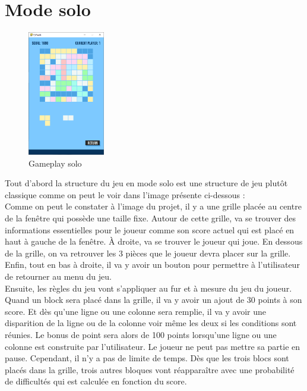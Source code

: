 \documentclass[a4paper]{report}
\begin{document}
\section{Mode solo}
\begin{figure}
    \centering
    \includegraphics[width=0.3\textwidth, trim=0pt 0pt 0pt 30pt]{images/3-ingame.png}
    \caption{Gameplay solo}
\end{figure}
Tout d'abord la structure du jeu en mode solo est une structure de jeu plutôt classique comme on peut le voir dans l'image présente ci-dessous :\\

Comme on peut le constater à l'image du projet, il y a une grille placée au centre de la fenêtre qui possède une taille fixe. Autour de cette grille, va se trouver des informations essentielles pour le joueur comme son score actuel qui est placé en haut à gauche de la fenêtre. À droite, va se trouver le joueur qui joue. En dessous de la grille, on va retrouver les 3 pièces que le joueur devra placer sur la grille. Enfin, tout en bas à droite, il va y avoir un bouton pour permettre à l'utilisateur de retourner au menu du jeu. \\

Ensuite, les règles du jeu vont s'appliquer au fur et à mesure du jeu du joueur. Quand un block sera placé dans la grille, il va y avoir un ajout de 30 points à son score. Et dès qu'une ligne ou une colonne sera remplie, il va y avoir une disparition de la ligne ou de la colonne voir même les deux si les conditions sont réunies. Le bonus de point sera alors de 100 points lorsqu'une ligne ou une colonne est construite par l'utilisateur. Le joueur ne peut pas mettre sa partie en pause. Cependant, il n'y a pas de limite de temps. Dès que les trois blocs sont placés dans la grille, trois autres bloques vont réapparaître avec une probabilité de difficultés qui est calculée en fonction du score. \\
\end{document}
